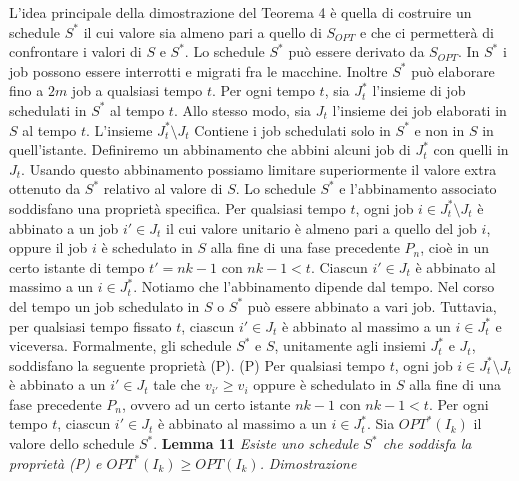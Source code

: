\documentclass[12pt]{article}
\begin{document}
L'idea principale della dimostrazione del Teorema 4 è quella di costruire un schedule $S^{*}$ il cui valore sia almeno pari a quello di $S_{OPT}$ e che ci permetterà di confrontare i valori di $S$ e $S^{*}$. Lo schedule $S^{*}$ può essere derivato da $S_{OPT}$. In $S^{*}$ i job possono essere interrotti e migrati fra le macchine. Inoltre $S^{*}$ può elaborare fino a $2m$ job a qualsiasi tempo $t$.
Per ogni tempo $t$, sia $J_{t}^{*}$ l'insieme di job schedulati in $S^{*}$ al tempo $t$. Allo stesso modo, sia $J_{t}$ l'insieme dei job elaborati in $S$ al tempo $t$. L'insieme $J_{t}^{*} \setminus J_{t}$ Contiene i job schedulati solo in $S^{*}$ e non in $S$ in quell'istante. Definiremo un abbinamento che abbini alcuni job di $J_{t}^{*}$ con quelli in $J_{t}$. Usando questo abbinamento possiamo limitare superiormente il valore extra ottenuto da $S^{*}$ relativo al valore di $S$. Lo schedule $S^{*}$ e l'abbinamento associato soddisfano una proprietà specifica. Per qualsiasi tempo $t$, ogni job $i \in J_{t}^{*} \setminus J_{t}$ è abbinato a un job $i' \in J_{t}$ il cui valore unitario è almeno pari a quello del job $i$, oppure il job $i$ è schedulato in $S$ alla fine di una fase precedente $P_{n}$, cioè in un certo istante di tempo $t' = nk -1$ con $nk -1 < t$. Ciascun $i' \in J_{t}$ è abbinato al massimo a un $i \in J_{t}^{*}$. Notiamo che l'abbinamento dipende dal tempo. Nel corso del tempo un job schedulato in $S$ o $S^{*}$ può essere abbinato a vari job. Tuttavia, per qualsiasi tempo fissato $t$, ciascun $i' \in J_{t}$ è abbinato al massimo a un $i \in J_{t}^{*}$ e viceversa. Formalmente, gli schedule $S^{*}$ e $S$, unitamente agli insiemi $J_{t}^{*}$ e $J_{t}$, soddisfano la seguente proprietà (P).
\newline
(P) Per qualsiasi tempo $t$, ogni job $i \in J_{t}^{*} \setminus J_{t}$ è abbinato a un $i' \in J_{t}$ tale che $v_{i'} \geq v_{i}$ oppure è schedulato in $S$ alla fine di una fase precedente $P_{n}$, ovvero ad un certo istante $nk - 1$ con $nk - 1 < t$. Per ogni tempo $t$, ciascun $i' \in J_{t}$ è abbinato al massimo a un $i \in J_{t}^{*}$.
Sia $OPT^{*}(I_{k})$ il valore dello schedule $S^{*}$.
\newline \newline
\textbf{Lemma 11}
\textit{Esiste uno schedule $S^{*}$ che soddisfa la proprietà (P) e $OPT^{*}(I_{k}) \geq OPT (I_{k})$.}
\textit{Dimostrazione}
\end{document}
